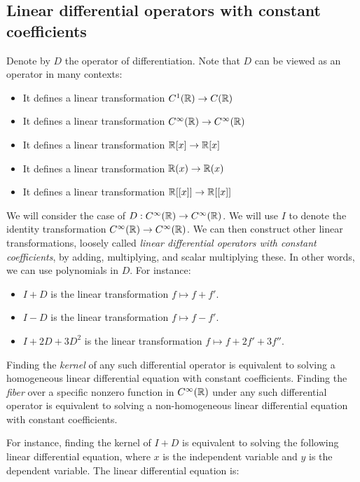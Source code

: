 \documentclass[10pt]{amsart}
\begin{document}
\subsection{Linear differential operators with constant coefficients}

Denote by $D$ the operator of differentiation. Note that $D$ can be
viewed as an operator in many contexts:

\begin{itemize}
\item It defines a linear transformation $C^1(\mathbb{R}) \to C(\mathbb{R})$
\item It defines a linear transformation $C^\infty(\mathbb{R}) \to C^\infty(\mathbb{R})$
\item It defines a linear transformation $\mathbb{R}[x] \to \mathbb{R}[x]$
\item It defines a linear transformation $\mathbb{R}(x) \to \mathbb{R}(x)$
\item It defines a linear transformation $\mathbb{R}[[x]] \to \mathbb{R}[[x]]$
\end{itemize}

We will consider the case of $D:C^\infty(\mathbb{R}) \to C^\infty(\mathbb{R})$. We
will use $I$ to denote the identity transformation $C^\infty(\mathbb{R}) \to
C^\infty(\mathbb{R})$. We can then construct other linear transformations,
loosely called {\em linear differential operators with constant
  coefficients}, by adding, multiplying, and scalar multiplying
these. In other words, we can use polynomials in $D$. For instance:

\begin{itemize}
\item $I + D$ is the linear transformation $f \mapsto f + f'$.
\item $I - D$ is the linear transformation $f \mapsto f - f'$.
\item $I + 2D + 3D^2$ is the linear transformation $f \mapsto f + 2f' + 3f''$.
\end{itemize}

Finding the {\em kernel} of any such differential operator is
equivalent to solving a homogeneous linear differential equation with
constant coefficients. Finding the {\em fiber} over a specific nonzero
function in $C^\infty(\mathbb{R})$ under any such differential operator is
equivalent to solving a non-homogeneous linear differential equation
with constant coefficients.

For instance, finding the kernel of $I + D$ is equivalent to solving
the following linear differential equation, where $x$ is the
independent variable and $y$ is the dependent variable. The linear
differential equation is:
\end{document}

